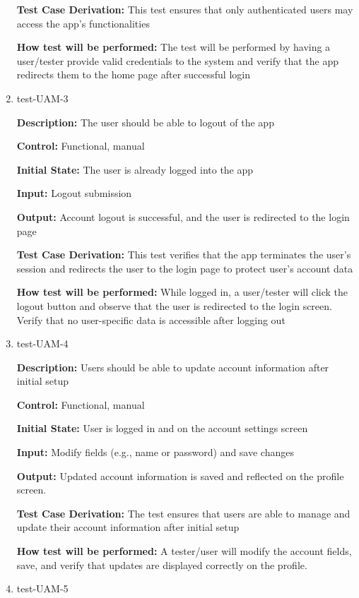 \documentclass[12pt, titlepage]{article}
\begin{document}
\begin{enumerate}
\textbf{Test Case Derivation:} This test ensures that only authenticated users
may access the app's functionalities

\textbf{How test will be performed:} The test will be performed by having a
user/tester provide valid credentials to the system and verify that the app
redirects them to the home page after successful login

\item{test-UAM-3\\}

\textbf{Description:} The user should be able to logout of the app

\textbf{Control:} Functional, manual
					
\textbf{Initial State:} The user is already logged into the app
					
\textbf{Input:} Logout submission
					
\textbf{Output:} Account logout is successful, and the user is redirected to the login page

\textbf{Test Case Derivation:} This test verifies that the app terminates the user's session and redirects the user to the login page to protect user's account data

\textbf{How test will be performed:} While logged in, a user/tester will click the logout button and observe that the user is redirected to the login screen. Verify that no user-specific data is accessible after logging out

\item{test-UAM-4}

\textbf{Description:} Users should be able to update account information after initial setup

\textbf{Control:} Functional, manual

\textbf{Initial State:} User is logged in and on the account settings screen

\textbf{Input:} Modify fields (e.g., name or password) and save changes

\textbf{Output:} Updated account information is saved and reflected on the profile screen.

\textbf{Test Case Derivation:} The test ensures that users are able to manage and update their account information after initial setup

\textbf{How test will be performed:} A tester/user will modify the account fields, save, and verify that updates are displayed correctly on the profile.

\item{test-UAM-5}


\end{enumerate}
\end{document}
